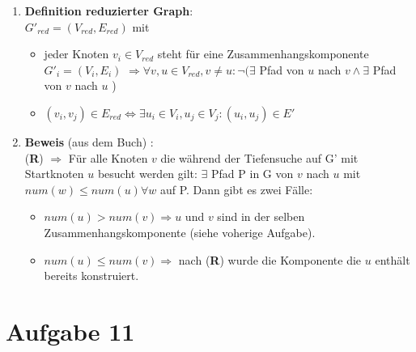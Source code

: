\documentclass[10pt,a4paper]{article}
\begin{document}
	\begin{enumerate}[label={\alph*)}]

		\item
			\textbf{Definition reduzierter Graph}: \\
			$G'_{red} = (V_{red},E_{red})$ mit
			\begin{itemize}
				\item
					jeder Knoten $v_{i} \in V_{red}$ steht für eine
					Zusammenhangskomponente $G'_i=(V_i,E_i)$
					$\Rightarrow \forall v,u \in V_{red}, v \neq u : 
					\neg(\exists $ Pfad von $ u $ nach $v \wedge \exists $ Pfad von $v$ nach $u$ )
				\item
					$(v_i,v_j) \in E_{red} \Leftrightarrow \exists u_i \in V_i,
						u_j \in V_j: (u_i,u_j) \in E'$
			\end{itemize}

		\item
		\textbf{Beweis} (aus dem Buch) : \\
		(\textbf{R}) $\Rightarrow$ Für alle Knoten $v$ die während der Tiefensuche
			auf G' mit Startknoten $u$ besucht werden gilt: $\exists$ Pfad P in G von
			$v$ nach $u$ mit $num(w) \leq num(u) \forall w$ auf P. Dann gibt es zwei Fälle:
			\begin{itemize}
				\item
					$num(u) > num(v) \Rightarrow u$ und $v$ sind in der selben Zusammenhangskomponente
					(siehe voherige Aufgabe).
				\item
					$num(u) \leq num(v) \Rightarrow $ nach (\textbf{R}) wurde die Komponente
						die $u$ enthält bereits konstruiert.
			\end{itemize}

	\end{enumerate}

\section*{Aufgabe 11}
\end{document}
